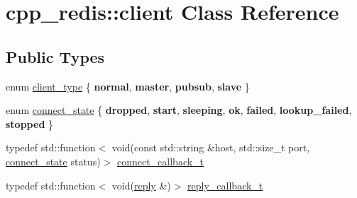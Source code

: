 \hypertarget{classcpp__redis_1_1client}{}\section{cpp\+\_\+redis\+:\+:client Class Reference}
\label{classcpp__redis_1_1client}
\subsection*{Public Types}
\begin{DoxyCompactItemize}
\item 
enum \hyperlink{classcpp__redis_1_1client_a388877b01b4e045cddb138e70a68e000}{client\+\_\+type} \{ {\bfseries normal}, 
{\bfseries master}, 
{\bfseries pubsub}, 
{\bfseries slave}
 \}
\item 
enum \hyperlink{classcpp__redis_1_1client_a2512bd48dd45391249a69bd720c1e4da}{connect\+\_\+state} \{ \newline
{\bfseries dropped}, 
{\bfseries start}, 
{\bfseries sleeping}, 
{\bfseries ok}, 
\newline
{\bfseries failed}, 
{\bfseries lookup\+\_\+failed}, 
{\bfseries stopped}
 \}
\item 
typedef std\+::function$<$ void(const std\+::string \&host, std\+::size\+\_\+t port, \hyperlink{classcpp__redis_1_1client_a2512bd48dd45391249a69bd720c1e4da}{connect\+\_\+state} status)$>$ \hyperlink{classcpp__redis_1_1client_a4bb592b64ededde5a6fcf8111ca2548f}{connect\+\_\+callback\+\_\+t}
\item 
typedef std\+::function$<$ void(\hyperlink{classcpp__redis_1_1reply}{reply} \&)$>$ \hyperlink{classcpp__redis_1_1client_a061a1140d36d2eaeda82b09a0bb3f9f2}{reply\+\_\+callback\+\_\+t}
\end{DoxyCompactItemize}
